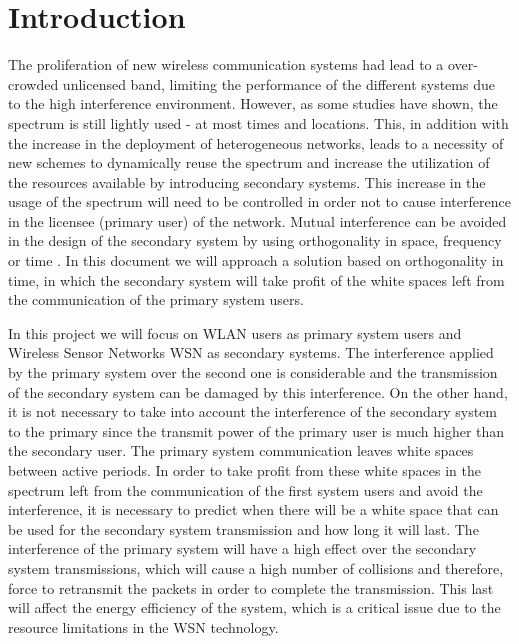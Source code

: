 \chapter{Introduction} \label{chapter:introduction}
The proliferation of new wireless communication systems had lead to a over-crowded unlicensed band, limiting the performance of the different systems due to the high interference environment. However, as some studies have shown, the spectrum is still lightly used \cite{ActiveMeasure}-\cite{CMA-Exp} at most times and locations. This, in addition with the increase in the deployment of heterogeneous networks, leads to a necessity of new schemes to dynamically reuse the spectrum and increase the utilization of the resources available by introducing secondary systems. This increase in the usage of the spectrum will need to be controlled in order not to cause interference in the licensee (primary user) of the network. Mutual interference can be avoided in the design of the secondary system by using orthogonality in space, frequency or time \cite{CMA-Exp}. In this document we will approach a solution based on orthogonality in time, in which the secondary system will take profit of the white spaces left from the communication of the primary system users.

In this project we will focus on \acs{WLAN} users as primary system users and Wireless Sensor Networks \acs{WSN} as secondary systems. The interference applied by the primary system over the second one is considerable and the transmission of the secondary system can be damaged by this interference. On the other hand, it is not necessary to take into account the interference of the secondary system to the primary since the transmit power of the primary user is much higher than the secondary user. The primary system communication leaves white spaces between active periods. In order to take profit from these white spaces in the spectrum left from the communication of the first system users and avoid the interference, it is necessary to predict when there will be a white space that can be used for the secondary system transmission and how long it will last. The interference of the primary system will have a high effect over the secondary system transmissions, which will cause a high number of collisions and therefore, force to retransmit the packets in order to complete the transmission. This last will affect the energy efficiency of the system, which is a critical issue due to the resource limitations in the \acs{WSN} technology.

